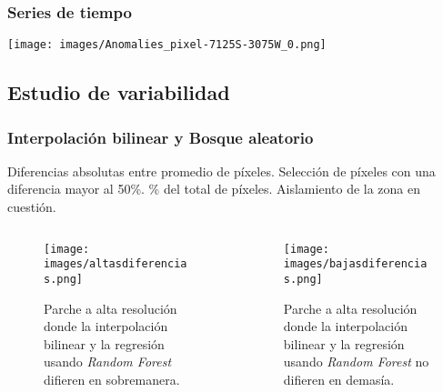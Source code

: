 \documentclass{beamer}
\begin{document}
  \begin{frame}
    \frametitle{Series de tiempo}
    
    \centering
    \texttt{[image: images/Anomalies\_pixel-7125S-3075W\_0.png]}
  \end{frame}



  \subsection*{Estudio de variabilidad}

  \begin{frame}
    \frametitle{Interpolación bilinear y Bosque aleatorio}

    \begin{outline}
      \1 Diferencias absolutas entre promedio de píxeles.
        \2 Selección de píxeles con una diferencia mayor al 50\%.
          \% del total de píxeles.
      \1 Aislamiento de la zona en cuestión.
    \end{outline}
  \end{frame}

  \begin{frame}
    \begin{columns}

      \begin{column}{0.5\textwidth}
        \begin{figure}
          \centering
          \texttt{[image: images/altasdiferencias.png]}
          \caption{Parche a alta resolución donde la interpolación bilinear y la regresión usando \textit{Random Forest} difieren en sobremanera.}
        \end{figure}
      \end{column}

      \begin{column}{0.5\textwidth}
        \begin{figure}
          \centering
          \texttt{[image: images/bajasdiferencias.png]}
          \caption{Parche a alta resolución donde la interpolación bilinear y la regresión usando \textit{Random Forest} no difieren en demasía.}
        \end{figure}
      \end{column}

    \end{columns}
  \end{frame}
\end{document}
